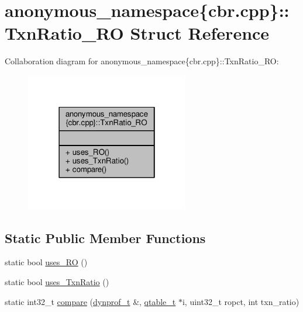 \hypertarget{structanonymous__namespace_02cbr_8cpp_03_1_1TxnRatio__RO}{\section{anonymous\-\_\-namespace\{cbr.\-cpp\}\-:\-:Txn\-Ratio\-\_\-\-R\-O Struct Reference}
\label{structanonymous__namespace_02cbr_8cpp_03_1_1TxnRatio__RO}
}


Collaboration diagram for anonymous\-\_\-namespace\{cbr.\-cpp\}\-:\-:Txn\-Ratio\-\_\-\-R\-O\-:
\nopagebreak
\begin{figure}[H]
\begin{center}
\leavevmode
\includegraphics[width=202pt]{structanonymous__namespace_02cbr_8cpp_03_1_1TxnRatio__RO__coll__graph}
\end{center}
\end{figure}
\subsection*{Static Public Member Functions}
\begin{DoxyCompactItemize}
\item 
static bool \hyperlink{structanonymous__namespace_02cbr_8cpp_03_1_1TxnRatio__RO_a8da7652a7d53568bde74f7d228eb1fab}{uses\-\_\-\-R\-O} ()
\item 
static bool \hyperlink{structanonymous__namespace_02cbr_8cpp_03_1_1TxnRatio__RO_a445de41bbbe999c7bf70c989bdd66e01}{uses\-\_\-\-Txn\-Ratio} ()
\item 
static int32\-\_\-t \hyperlink{structanonymous__namespace_02cbr_8cpp_03_1_1TxnRatio__RO_a7238a8f11dc144113598cf6774a36d3a}{compare} (\hyperlink{structstm_1_1dynprof__t}{dynprof\-\_\-t} \&, \hyperlink{structstm_1_1qtable__t}{qtable\-\_\-t} $\ast$i, uint32\-\_\-t ropct, int txn\-\_\-ratio)
\end{DoxyCompactItemize}


